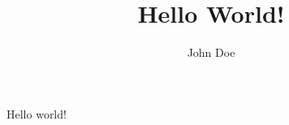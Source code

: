\documentclass[12pt]{article}
\begin{document}
    \title{Hello World!}
    \author{John Doe}
    \date{}
    
    \maketitle
    
    Hello world!
\end{document}
